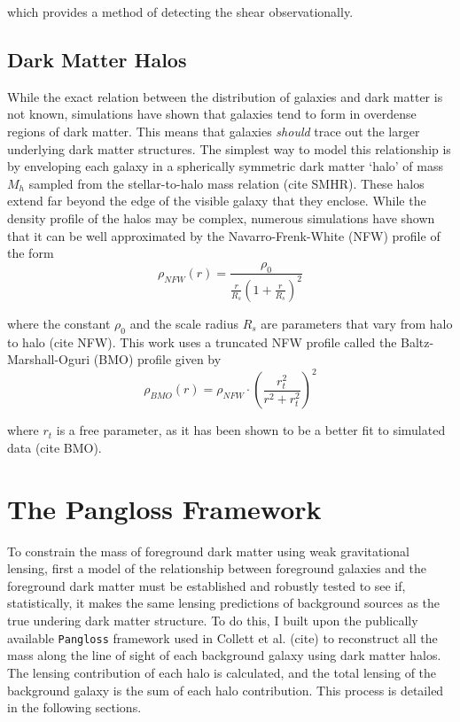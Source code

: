 \documentclass[%
 reprint,
 amsmath,amssymb,
 aps,
]{revtex4-1}
\begin{document}
 \noindent which provides a method of detecting the shear observationally.

\subsection*{Dark Matter Halos}

While the exact relation between the distribution of galaxies and dark matter is not known, simulations have shown that galaxies tend to form in overdense regions of dark matter. This means that galaxies \textit{should} trace out the larger underlying dark matter structures. The simplest way to model this relationship is by enveloping each galaxy in a spherically symmetric dark matter `halo' of mass $M_h$ sampled from the stellar-to-halo mass relation (cite SMHR). These halos extend far beyond the edge of the visible galaxy that they enclose. While the density profile of the halos may be complex, numerous simulations have shown that it can be well approximated by the Navarro-Frenk-White (NFW) profile of the form
\begin{equation}
\rho_{NFW}(r)=\frac{\rho_0}{\frac{r}{R_s}\left(1+\frac{r}{R_s}\right)^2}
\end{equation}

\noindent where the constant $\rho_0$ and the scale radius $R_s$ are parameters that vary from halo to halo (cite NFW). This work uses a truncated NFW profile called the Baltz-Marshall-Oguri (BMO) profile given by
\begin{equation}
\rho_{BMO}(r)=\rho_{NFW}\cdot\left(\frac{r_t^2}{r^2+r_t^2}\right)^2
\end{equation}

\noindent where $r_t$ is a free parameter, as it has been shown to be a better fit to simulated data (cite BMO).

\section{The Pangloss Framework}

To constrain the mass of foreground dark matter using weak gravitational lensing, first a model of the relationship between foreground galaxies and the foreground dark matter must be established and robustly tested to see if, statistically, it makes the same lensing predictions of background sources as the true undering dark matter structure. To do this, I built upon the publically available \texttt{Pangloss} framework used in Collett et al. (cite) to reconstruct all the mass along the line of sight of each background galaxy using dark matter halos. The lensing contribution of each halo is calculated, and the total lensing of the background galaxy is the sum of each halo contribution. This process is detailed in the following sections.
\end{document}
